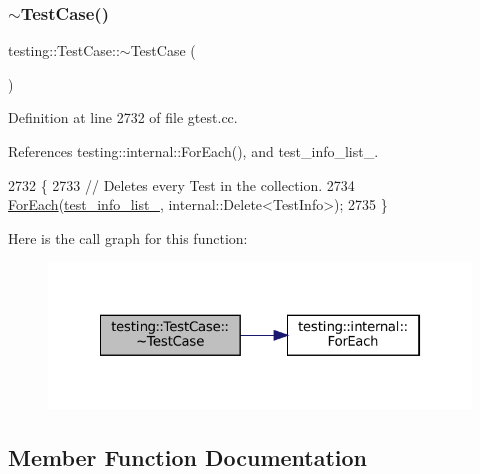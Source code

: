\subsubsection{\texorpdfstring{$\sim$\+Test\+Case()}{~TestCase()}}
{\footnotesize\ttfamily testing\+::\+Test\+Case\+::$\sim$\+Test\+Case (\begin{DoxyParamCaption}{ }\end{DoxyParamCaption})\hspace{0.3cm}{\ttfamily [virtual]}}



Definition at line 2732 of file gtest.\+cc.



References testing\+::internal\+::\+For\+Each(), and test\+\_\+info\+\_\+list\+\_\+.


\begin{DoxyCode}
2732                     \{
2733   \textcolor{comment}{// Deletes every Test in the collection.}
2734   \hyperlink{namespacetesting_1_1internal_a52f5504ed65d116201ccb8f99a44fd7e}{ForEach}(\hyperlink{classtesting_1_1TestCase_adce272a48399dd67a7bdd14fa7e99b80}{test\_info\_list\_}, internal::Delete<TestInfo>);
2735 \}
\end{DoxyCode}
Here is the call graph for this function\+:
\nopagebreak
\begin{figure}[H]
\begin{center}
\leavevmode
\includegraphics[width=322pt]{classtesting_1_1TestCase_a96ab68dd1f8f64a7087ac34ff64a2e46_cgraph}
\end{center}
\end{figure}


\subsection{Member Function Documentation}
\mbox{\label{classtesting_1_1TestCase_a6d5fc5003bc3352f3ddae7dadc6d2364}} 
